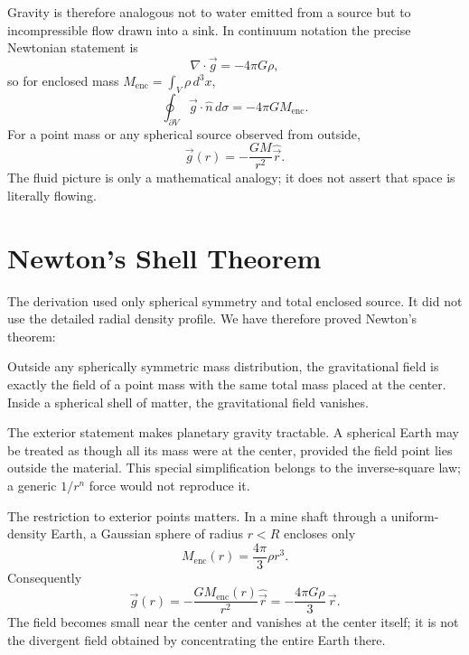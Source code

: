 Gravity is therefore analogous not to water emitted from a source but to
incompressible flow drawn into a sink. In continuum notation the precise
Newtonian statement is
\begin{equation}
  \nabla\cdot\vec g=-4\pi G\rho,
  \label{eq:l01-poisson-divergence}
\end{equation}
so for enclosed mass
\(M_{\mathrm{enc}}=\int_V\rho\,d^3x\),
\begin{equation}
  \oint_{\partial V}\vec g\cdot\hat n\,d\sigma
  =-4\pi G M_{\mathrm{enc}}.
  \label{eq:l01-gravity-gauss}
\end{equation}
For a point mass or any spherical source observed from outside,
\begin{equation}
  \vec g(r)=-\frac{GM}{r^2}\hat{\vec r}.
  \label{eq:l01-exterior-field}
\end{equation}
The fluid picture is only a mathematical analogy; it does not assert that
space is literally flowing.

\section{Newton's Shell Theorem}

The derivation used only spherical symmetry and total enclosed source. It
did not use the detailed radial density profile. We have therefore proved
Newton's theorem:

\begin{theorem}
Outside any spherically symmetric mass distribution, the gravitational field
is exactly the field of a point mass with the same total mass placed at the
center. Inside a spherical shell of matter, the gravitational field
vanishes.
\end{theorem}

The exterior statement makes planetary gravity tractable. A spherical Earth
may be treated as though all its mass were at the center, provided the field
point lies outside the material. This special simplification belongs to the
inverse-square law; a generic \(1/r^n\) force would not reproduce it.

The restriction to exterior points matters. In a mine shaft through a
uniform-density Earth, a Gaussian sphere of radius \(r<R\) encloses only
\begin{equation}
  M_{\mathrm{enc}}(r)=\frac{4\pi}{3}\rho r^3.
\end{equation}
Consequently
\begin{equation}
  \vec g(r)
  =
  -\frac{GM_{\mathrm{enc}}(r)}{r^2}\hat{\vec r}
  =
  -\frac{4\pi G\rho}{3}\,\vec r.
  \label{eq:l01-inside-uniform-sphere}
\end{equation}
The field becomes small near the center and vanishes at the center itself;
it is not the divergent field obtained by concentrating the entire Earth
there.

